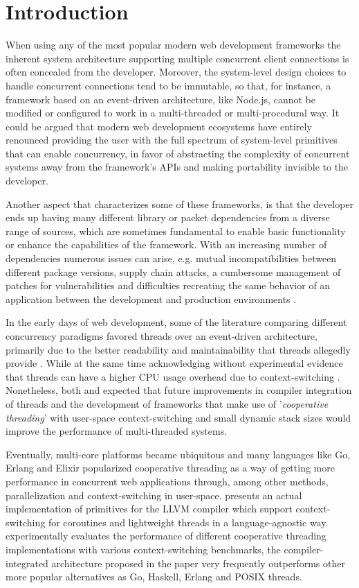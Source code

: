 \section{Introduction}
When using any of the most popular modern web development frameworks the inherent system architecture supporting multiple concurrent client connections is often concealed from the developer. Moreover, the system-level design choices to handle concurrent connections tend to be immutable, so that, for instance, a framework based on an event-driven architecture, like Node.js, cannot be modified or configured to work in a multi-threaded or multi-procedural way. It could be argued that modern web development ecosystems have entirely renounced providing the user with the full spectrum of system-level primitives that can enable concurrency, in favor of abstracting the complexity of concurrent systems away from the framework's APIs and making portability invisible to the developer.

Another aspect that characterizes some of these frameworks, is that the developer ends up having many different library or packet dependencies from a diverse range of sources, which are sometimes fundamental to enable basic functionality or enhance the capabilities of the framework. With an increasing number of dependencies numerous issues can arise, e.g. mutual incompatibilities between different package versions, supply chain attacks, a cumbersome management of patches for vulnerabilities and difficulties recreating the same behavior of an application between the development and production environments \cite{2012PoulHenning}. 

In the early days of web development, some of the literature comparing different concurrency paradigms favored threads over an event-driven architecture, primarily due to the better readability and maintainability that threads allegedly provide \cite{2003Events}\cite{2005Threads}. While at the same time acknowledging without experimental evidence that threads can have a higher CPU usage overhead due to context-switching \cite{2003Events}. Nonetheless, both \cite{2003Events} and \cite{2005Threads} expected that future improvements in compiler integration of threads and the development of frameworks that make use of '\textit{cooperative threading}' with user-space context-switching and small dynamic stack sizes would improve the performance of multi-threaded systems.

Eventually, multi-core platforms became ubiquitous and many languages like Go, Erlang and Elixir popularized cooperative threading as a way of getting more performance in concurrent web applications through, among other methods, parallelization and context-switching in user-space. \cite{2013ContextSwitching} presents an actual implementation of primitives for the LLVM compiler which support context-switching for coroutines and lightweight threads in a language-agnostic way. \cite{2013ContextSwitching} experimentally evaluates the performance of different cooperative threading implementations with various context-switching benchmarks, the compiler-integrated architecture proposed in the paper very frequently outperforms other more popular alternatives as Go, Haskell, Erlang and POSIX threads. 

